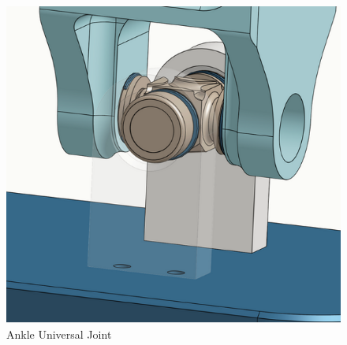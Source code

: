 \documentclass{article}
\begin{document}
\begin{figure}[H]
    \centering
    \includegraphics[scale=1]{assets/Design Presentation/U Joint.png}
    \caption{Ankle Universal Joint}
    \label{fig:enter-label}
\end{figure}
\end{document}

